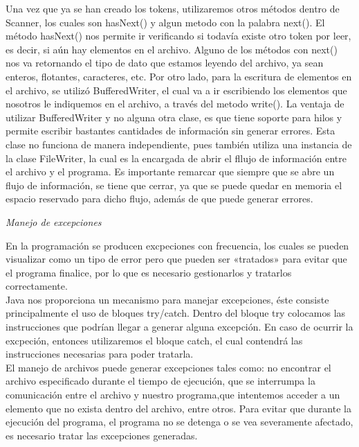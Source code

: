 \documentclass[12pt,letterpaper]{article}
\begin{document}
\begin{large}
Una vez que ya se han creado los tokens, utilizaremos otros métodos dentro de Scanner, los cuales son hasNext() y algun metodo con la palabra next(). El método hasNext() nos permite ir verificando si todavía existe otro token por leer, es decir, si aún hay elementos en el archivo. Alguno de los métodos con next() nos va retornando el tipo de dato que estamos leyendo del archivo, ya sean enteros, flotantes, caracteres, etc.\newpage
Por otro lado, para la escritura de elementos en el archivo, se utilizó BufferedWriter, el cual va a ir escribiendo los elementos que nosotros le indiquemos en el archivo, a través del metodo write(). La ventaja de utilizar BufferedWriter y no alguna otra clase, es que tiene soporte para hilos y permite escribir bastantes cantidades de información sin generar errores. Esta clase no funciona de manera independiente, pues también utiliza una instancia de la clase FileWriter, la cual es la encargada de abrir el fllujo de información entre el archivo y el programa.
Es importante remarcar que siempre que se abre un flujo de información, se tiene que cerrar, ya que se puede quedar en memoria el espacio reservado para dicho flujo, además de que puede generar errores.\par
\vspace{0.5cm}
\noindent\textit{Manejo de excepciones}\par
En la programación se producen excpeciones con frecuencia, los cuales se pueden visualizar como un tipo de error pero que pueden ser «tratados» para evitar que el programa finalice, por lo que es necesario gestionarlos y tratarlos correctamente.\\
Java nos proporciona un mecanismo para manejar excepciones, éste consiste principalmente el uso de bloques try/catch. Dentro del bloque try colocamos las instrucciones que podrían llegar a generar alguna excepción. En caso de ocurrir la excpeción, entonces utilizaremos el bloque catch, el cual contendrá las instrucciones necesarias para poder tratarla.\\ 
El manejo de archivos puede generar excepciones  tales como: no encontrar el archivo  especificado durante el tiempo de ejecución, que se interrumpa la comunicación entre el archivo y nuestro programa,que intentemos acceder a un elemento que no exista dentro del archivo, entre otros. Para evitar que durante la ejecución del programa, el programa no se detenga o se vea severamente afectado, es necesario tratar las excepciones generadas.\par
\end{large}
\end{document}

